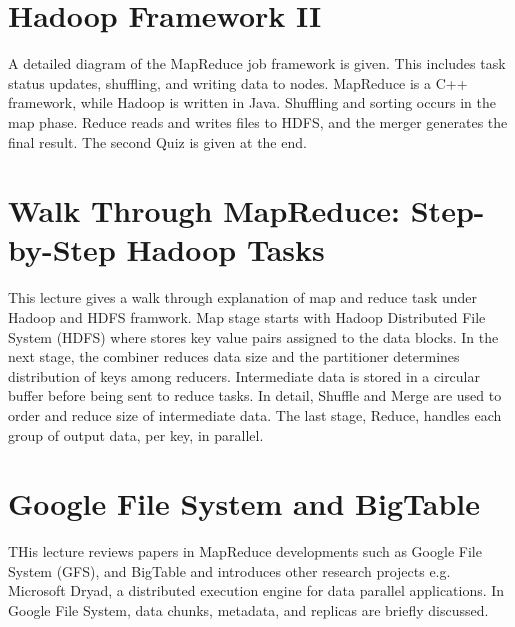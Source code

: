\section{Hadoop Framework II}

A detailed diagram of the MapReduce job framework is given. This
includes task status updates, shuffling, and writing data to nodes.
MapReduce is a C++ framework, while Hadoop is written in Java. Shuffling
and sorting occurs in the map phase. Reduce reads and writes files to
HDFS, and the merger generates the final result. The second Quiz is
given at the end.


\section{Walk Through MapReduce: Step-by-Step Hadoop Tasks}

This lecture gives a walk through explanation of map and reduce task under
Hadoop and HDFS framwork. Map stage starts with Hadoop Distributed File System
(HDFS) where stores key value pairs assigned to the data blocks. In the next
stage, the combiner reduces data size and the partitioner determines
distribution of keys among reducers. Intermediate data is stored in a circular
buffer before being sent to reduce tasks. In detail, Shuffle and Merge are used
to order and reduce size of intermediate data. The last stage, Reduce, handles
each group of output data, per key, in parallel.


\section{Google File System and BigTable}

THis lecture reviews papers in MapReduce developments such as Google File
System (GFS), and BigTable and introduces other research projects e.g.
Microsoft Dryad, a distributed execution engine for data parallel applications.
In Google File System, data chunks, metadata, and replicas are briefly discussed.

